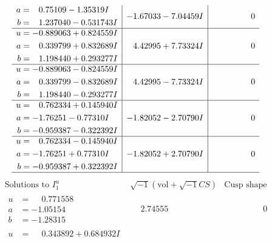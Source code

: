 \documentclass[1p]{elsarticle_modified}
\theoremstyle{definition}
\newcommand{\I}{\sqrt{-1}}
\begin{document}
$$\begin{array}{c|c|c}
\begin{aligned}
a &= \phantom{-}0.75109 - 1.35319 I \\
b &= \phantom{-}1.237040 - 0.531743 I\end{aligned}
 & -1.67033 - 7.04459 I & \phantom{-0.000000 } 0 \\ \hline\begin{aligned}
u &= -0.889063 + 0.824559 I \\
a &= \phantom{-}0.339799 + 0.832689 I \\
b &= \phantom{-}1.198440 + 0.293277 I\end{aligned}
 & \phantom{-}4.42995 + 7.73324 I & \phantom{-0.000000 } 0 \\ \hline\begin{aligned}
u &= -0.889063 - 0.824559 I \\
a &= \phantom{-}0.339799 - 0.832689 I \\
b &= \phantom{-}1.198440 - 0.293277 I\end{aligned}
 & \phantom{-}4.42995 - 7.73324 I & \phantom{-0.000000 } 0 \\ \hline\begin{aligned}
u &= \phantom{-}0.762334 + 0.145940 I \\
a &= -1.76251 - 0.77310 I \\
b &= -0.959387 - 0.322392 I\end{aligned}
 & -1.82052 - 2.70790 I & \phantom{-0.000000 } 0 \\ \hline\begin{aligned}
u &= \phantom{-}0.762334 - 0.145940 I \\
a &= -1.76251 + 0.77310 I \\
b &= -0.959387 + 0.322392 I\end{aligned}
 & -1.82052 + 2.70790 I & \phantom{-0.000000 } 0\\
 \hline 
 \end{array}$$\newpage$$\begin{array}{c|c|c}  
\text{Solutions to }I^u_{1}& \I (\text{vol} + \sqrt{-1}CS) & \text{Cusp shape}\\
 \hline 
\begin{aligned}
u &= \phantom{-}0.771558\phantom{ +0.000000I} \\
a &= -1.05154\phantom{ +0.000000I} \\
b &= -1.28315\phantom{ +0.000000I}\end{aligned}
 & \phantom{-}2.74555\phantom{ +0.000000I} & \phantom{-0.000000 } 0 \\ \hline\begin{aligned}
u &= \phantom{-}0.343892 + 0.684932 I \\

\end{aligned}
\end{array}$$
\end{document}

